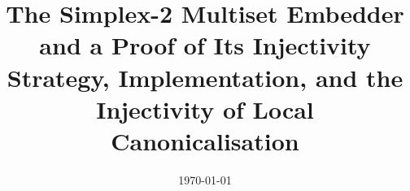 \documentclass[11pt,a4paper]{article}
\title{\textbf{The Simplex-2 Multiset Embedder and a Proof of Its Injectivity}\\[0.4em]
       \large Strategy, Implementation, and the Injectivity of Local Canonicalisation}
\date{\today}
\begin{document}
\maketitle
\tableofcontents
\bigskip







\appendix
\end{document}
